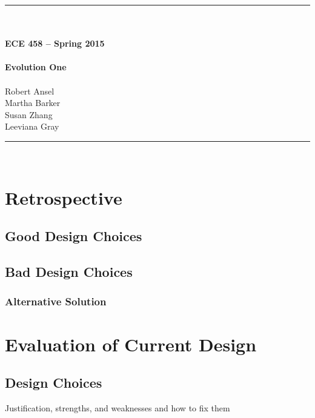 \documentclass{article}
\begin{document}
\begin{center}
\rule{6.5in}{0.5mm}\\~\\
{\bf \large ECE 458 -- Spring 2015}\\~\\  
{\huge \bf Evolution One}\\~\\
Robert Ansel\\
Martha Barker\\
Susan Zhang\\
Leeviana Gray\\
\rule{6.5in}{0.5mm}\\
\end{center}
\tableofcontents
\pagebreak

\section{Retrospective}

\subsection{Good Design Choices}

\subsection{Bad Design Choices}

\subsubsection{Alternative Solution}


\section{Evaluation of Current Design}

\subsection{Design Choices}
Justification, strengths, and weaknesses and how to fix them
\end{document}
